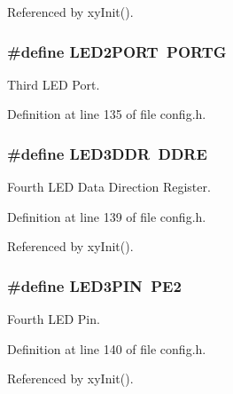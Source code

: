 Referenced by xy\-Init().

\hypertarget{group__config_ga4b6e8cddebfbc6f1f5132eb93b92d60f}{
\subsubsection[{L\-E\-D2\-P\-O\-R\-T}]{\setlength{\rightskip}{0pt plus 5cm}\#define L\-E\-D2\-P\-O\-R\-T~P\-O\-R\-T\-G}}\label{group__config_ga4b6e8cddebfbc6f1f5132eb93b92d60f}


Third L\-E\-D Port. 



Definition at line 135 of file config.\-h.

\hypertarget{group__config_ga09535652dd0ca340b20840c848cb6093}{
\subsubsection[{L\-E\-D3\-D\-D\-R}]{\setlength{\rightskip}{0pt plus 5cm}\#define L\-E\-D3\-D\-D\-R~D\-D\-R\-E}}\label{group__config_ga09535652dd0ca340b20840c848cb6093}


Fourth L\-E\-D Data Direction Register. 



Definition at line 139 of file config.\-h.



Referenced by xy\-Init().

\hypertarget{group__config_ga2663b8fc01c4753562adc572cf12a5ed}{
\subsubsection[{L\-E\-D3\-P\-I\-N}]{\setlength{\rightskip}{0pt plus 5cm}\#define L\-E\-D3\-P\-I\-N~P\-E2}}\label{group__config_ga2663b8fc01c4753562adc572cf12a5ed}


Fourth L\-E\-D Pin. 



Definition at line 140 of file config.\-h.



Referenced by xy\-Init().

